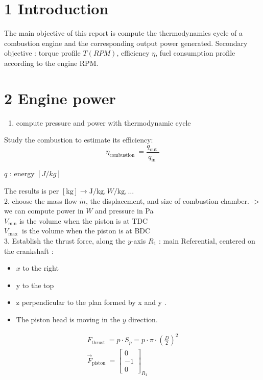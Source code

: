 \documentclass[10pt]{article}
\begin{document}
\section*{1 Introduction}
The main objective of this report is compute the thermodynamics cycle of a combustion engine and the corresponding output power generated. 
Secondary objective : torque profile $T(RPM)$, efficiency $\eta$, fuel consumption profile according to the engine RPM.

\section*{2 Engine power}
\begin{enumerate}
  \item compute pressure and power with thermodynamic cycle
\end{enumerate}

Study the combustion to estimate its efficiency:
\begin{equation*}
\eta_{\text {combustion }}=\frac{q_{\text {out }}}{q_{\text {in }}} \tag{1}
\end{equation*}


$q$ : energy $[J / kg]$

The results is per $[\mathrm{kg}] \rightarrow \mathrm{J} / \mathrm{kg}, W / \mathrm{kg}, \ldots$\\
2. choose the mass flow $\dot{m}$, the displacement, and size of combustion chamber. -> we can compute power in $W$ and pressure in Pa\\
$V_{\min }$ is the volume when the piston is at TDC\\
$V_{\text {max }}$ is the volume when the piston is at BDC\\
3. Establish the thrust force, along the $y$-axis $R_{1}$ : main Referential, centered on the crankshaft :\\

\begin{itemize}
	\item $x$ to the right
  \item y to the top
  \item z perpendicular to the plan formed by x and y .
  \item The piston head is moving in the $y$ direction.
\end{itemize}


\begin{gather*}
F_{\text {thrust }}=p \cdot S_{p}=p \cdot \pi \cdot\left(\frac{D}{2}\right)^{2}  \tag{2}\\
\vec{F}_{\text {piston }}=\left[\begin{array}{c}
0 \\
-1 \\
0
\end{array}\right]_{R_{1}} \tag{3}
\end{gather*}
\end{document}
